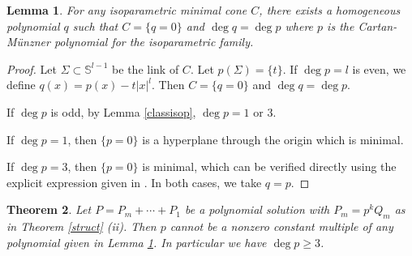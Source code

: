 \documentclass[pdflatex,sn-mathphys-num]{sn-jnl}%
\theoremstyle{thmstyleone}%
\newtheorem{theorem}{Theorem}[section]%
\newtheorem{lemma}[theorem]{Lemma}
\theoremstyle{thmstyletwo}%
\theoremstyle{thmstylethree}%
\newcommand{\SSS}{\mathbb{S}}
\begin{document}
\begin{lemma}\label{tilde.p}
    For any isoparametric minimal cone $C$, there exists a homogeneous polynomial $q$  such that $C=\{q=0\}$ and $\deg q=\deg p$ where $p$ is the Cartan-M\"unzner polynomial for the isoparametric family.
\end{lemma}
\begin{proof}
    Let $\Sigma\subset \SSS^{l-1}$ be the link of $C$. Let $p(\Sigma)=\{t\}$. If $\deg p=l$ is even, we define $q(x)=p(x)-t |x|^{l}$. Then $C=\{q=0\}$ and $\deg q=\deg p$.

    If $\deg p$ is odd, by Lemma \ref{classisop}, $\deg p=1$ or $3$.
    
    If $\deg p=1$, then $\{p=0\}$ is a hyperplane through the origin which is minimal.


If $\deg p = 3$, then $\{p = 0\}$ is minimal, which can be verified directly using the explicit expression given in \cite[Example~2]{TkClifford}. In both cases, we take $q=p$.
\end{proof}
\begin{theorem}\label{noisopara}
	Let $P=P_m+\cdots+P_1$ be a polynomial solution with $P_m=p ^kQ_m$ as in Theorem \ref{struct} (ii). Then $p$ cannot be a nonzero constant multiple of any polynomial given in Lemma \ref{tilde.p}.
	In particular we have $\deg p \ge 3$.
\end{theorem}
\end{document}
